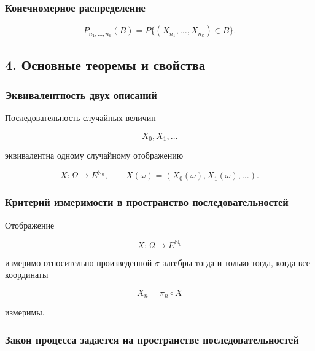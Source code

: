 \documentclass[
  11pt,
  a4paper,
]{article}
\begin{document}
\subsubsection{Конечномерное
распределение}\label{ux43aux43eux43dux435ux447ux43dux43eux43cux435ux440ux43dux43eux435-ux440ux430ux441ux43fux440ux435ux434ux435ux43bux435ux43dux438ux435}

\[
P_{n_1,\ldots,n_k}(B)
=
P\{(X_{n_1},\ldots,X_{n_k})\in B\}.
\]

\subsection{4. Основные теоремы и
свойства}\label{ux43eux441ux43dux43eux432ux43dux44bux435-ux442ux435ux43eux440ux435ux43cux44b-ux438-ux441ux432ux43eux439ux441ux442ux432ux430}

\subsubsection{Эквивалентность двух
описаний}\label{ux44dux43aux432ux438ux432ux430ux43bux435ux43dux442ux43dux43eux441ux442ux44c-ux434ux432ux443ux445-ux43eux43fux438ux441ux430ux43dux438ux439}

Последовательность случайных величин

\[
X_0,X_1,\ldots
\]

эквивалентна одному случайному отображению

\[
X:\Omega\to E^{\mathbb N_0},
\qquad
X(\omega)=(X_0(\omega),X_1(\omega),\ldots).
\]

\subsubsection{Критерий измеримости в пространство
последовательностей}\label{ux43aux440ux438ux442ux435ux440ux438ux439-ux438ux437ux43cux435ux440ux438ux43cux43eux441ux442ux438-ux432-ux43fux440ux43eux441ux442ux440ux430ux43dux441ux442ux432ux43e-ux43fux43eux441ux43bux435ux434ux43eux432ux430ux442ux435ux43bux44cux43dux43eux441ux442ux435ux439}

Отображение

\[
X:\Omega\to E^{\mathbb N_0}
\]

измеримо относительно произведенной \(\sigma\)-алгебры тогда и только
тогда, когда все координаты

\[
X_n=\pi_n\circ X
\]

измеримы.

\subsubsection{Закон процесса задается на пространстве
последовательностей}\label{ux437ux430ux43aux43eux43d-ux43fux440ux43eux446ux435ux441ux441ux430-ux437ux430ux434ux430ux435ux442ux441ux44f-ux43dux430-ux43fux440ux43eux441ux442ux440ux430ux43dux441ux442ux432ux435-ux43fux43eux441ux43bux435ux434ux43eux432ux430ux442ux435ux43bux44cux43dux43eux441ux442ux435ux439}
\end{document}
